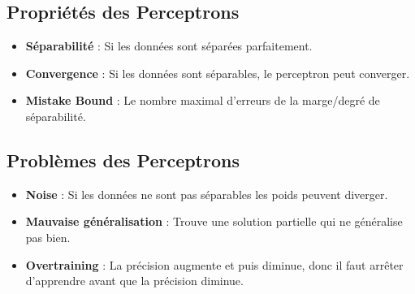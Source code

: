 \subsection{Propriétés des Perceptrons}
\label{sub:propriétés_des_perceptrons}
\begin{itemize}
    \item \textbf{Séparabilité} : Si les données sont séparées parfaitement.
    \item \textbf{Convergence} : Si les données sont séparables, le perceptron peut converger.
    \item \textbf{Mistake Bound} : Le nombre maximal d'erreurs de la marge/degré de séparabilité.
\end{itemize}


\subsection{Problèmes des Perceptrons}
\label{sub:problèmes_des_perceptrons}
\begin{itemize}
    \item \textbf{Noise} : Si les données ne sont pas séparables les poids peuvent diverger.
    \item \textbf{Mauvaise généralisation} : Trouve une solution partielle qui ne généralise pas bien.
    \item \textbf{Overtraining} : La précision augmente et puis diminue, donc il faut arrêter d'apprendre avant que la 
    précision diminue.
\end{itemize}

